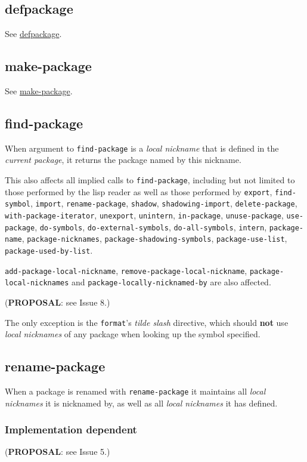 \documentclass[11pt]{article}
\begin{document}
\subsection{defpackage}
\label{sec:org4ed222a}
See \hyperref[sec:orgc0587b2]{defpackage}.
\subsection{make-package}
\label{sec:orgf4cc697}
See \hyperref[sec:org57ff19a]{make-package}.
\subsection{find-package}
\label{sec:orgfa4b61f}
When argument to \texttt{find-package} is a \emph{local nickname} that is defined in the
\emph{current package}, it returns the package named by this nickname.

This also affects all implied calls to \texttt{find-package}, including but not limited
to those performed by the lisp reader as well as those performed by \texttt{export},
\texttt{find-symbol}, \texttt{import}, \texttt{rename-package}, \texttt{shadow}, \texttt{shadowing-import},
\texttt{delete-package}, \texttt{with-package-iterator}, \texttt{unexport}, \texttt{unintern}, \texttt{in-package},
\texttt{unuse-package}, \texttt{use-package}, \texttt{do-symbols}, \texttt{do-external-symbols},
\texttt{do-all-symbols}, \texttt{intern}, \texttt{package-name}, \texttt{package-nicknames},
\texttt{package-shadowing-symbols}, \texttt{package-use-list}, \texttt{package-used-by-list}.

\texttt{add-package-local-nickname}, \texttt{remove-package-local-nickname},
\texttt{package-local-nicknames} and \texttt{package-locally-nicknamed-by} are also affected.

(\textbf{PROPOSAL}: see Issue 8.)

The only exception is the \texttt{format}'s \emph{tilde slash} directive, which should \textbf{not}
use \emph{local nicknames} of any package when looking up the symbol specified.
\subsection{rename-package}
\label{sec:org22ba6cb}
When a package is renamed with \texttt{rename-package} it maintains all \emph{local nicknames}
it is nicknamed by, as well as all \emph{local nicknames} it has defined.
\subsubsection{Implementation dependent}
\label{sec:org12b91bb}
(\textbf{PROPOSAL}: see Issue 5.)
\end{document}
